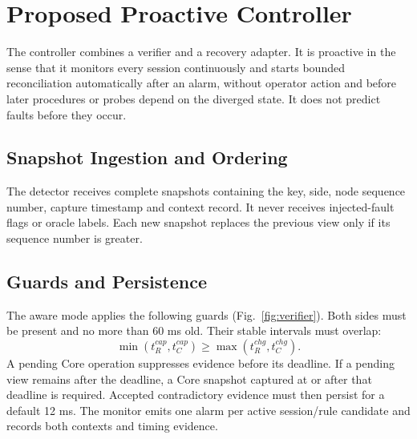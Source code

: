 \documentclass[conference]{IEEEtran}
\begin{document}
\section{Proposed Proactive Controller}
The controller combines a verifier and a recovery adapter. It is proactive in the sense that it monitors every session continuously and starts bounded reconciliation automatically after an alarm, without operator action and before later procedures or probes depend on the diverged state. It does not predict faults before they occur.

\subsection{Snapshot Ingestion and Ordering}
The detector receives complete snapshots containing the key, side, node sequence number, capture timestamp and context record. It never receives injected-fault flags or oracle labels. Each new snapshot replaces the previous view only if its sequence number is greater.

\subsection{Guards and Persistence}
The aware mode applies the following guards (Fig.~\ref{fig:verifier}). Both sides must be present and no more than 60 ms old. Their stable intervals must overlap:
\begin{equation}
\min(t^{cap}_R,t^{cap}_C)\geq\max(t^{chg}_R,t^{chg}_C).
\end{equation}
A pending Core operation suppresses evidence before its deadline. If a pending view remains after the deadline, a Core snapshot captured at or after that deadline is required. Accepted contradictory evidence must then persist for a default 12 ms. The monitor emits one alarm per active session/rule candidate and records both contexts and timing evidence.
\end{document}
